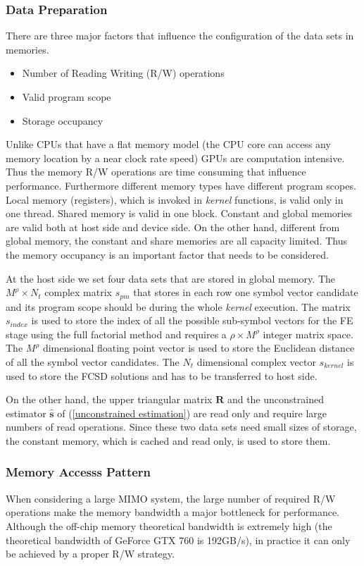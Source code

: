 \documentclass[letterpaper, 10pt, conference, twoside]{ieeeconf}
\begin{document}
\subsubsection{Data Preparation}\label{data preparation}
There are three major factors that influence the configuration of the data sets in memories.
\begin{itemize}
\item Number of Reading Writing (R/W) operations
\item Valid program scope
\item Storage occupancy
\end{itemize}

Unlike CPUs that have a flat memory model (the CPU core can access any memory location by a near clock rate speed) GPUs are computation intensive. Thus the memory R/W operations are time consuming that influence performance. Furthermore different memory types have different program scopes. Local memory (registers), which is invoked in \textit{kernel} functions, is valid only in one thread. Shared memory is valid in one block. Constant and global memories are valid both at host side and device side. On the other hand, different from global memory, the constant and share memories are all capacity limited. Thus the memory occupancy is an important factor that needs to be considered.
 
At the host side we set four data sets that are stored in global memory. The $M^{\rho}\times N_{t}$ complex matrix $\mathit{s_{pm}}$ that stores in each row one symbol vector candidate and its program scope should be during the whole \textit{kernel} execution. The matrix $\mathit{s_{index}}$ is used to store the index of all the possible sub-symbol vectors for the FE stage using the full factorial method and requires a $\rho\times M^{\rho}$  integer matrix space. The $M^{\rho}$ dimensional floating point vector is used to store the Euclidean distance of all the symbol vector candidates. The $N_{t}$ dimensional complex vector $\mathit{s_{kernel}}$ is used to store the FCSD solutions and has to be transferred to host side.

On the other hand, the upper triangular matrix $\mathbf{R}$ and the unconstrained estimator $\mathbf{\hat{s}}$ of (\ref{unconstrained estimation}) are read only and require large numbers of read operations. Since these two data sets need small sizes of storage, the constant memory, which is cached and read only, is used to store them.
\subsubsection{Memory Accesss Pattern}
When considering a large MIMO system, the large number of required R/W operations make the memory bandwidth a major bottleneck for performance. Although the off-chip memory theoretical bandwidth is extremely high (the theoretical bandwidth of GeForce GTX 760 is 192GB/s), in practice it can only be achieved by a proper R/W strategy.
\end{document}
